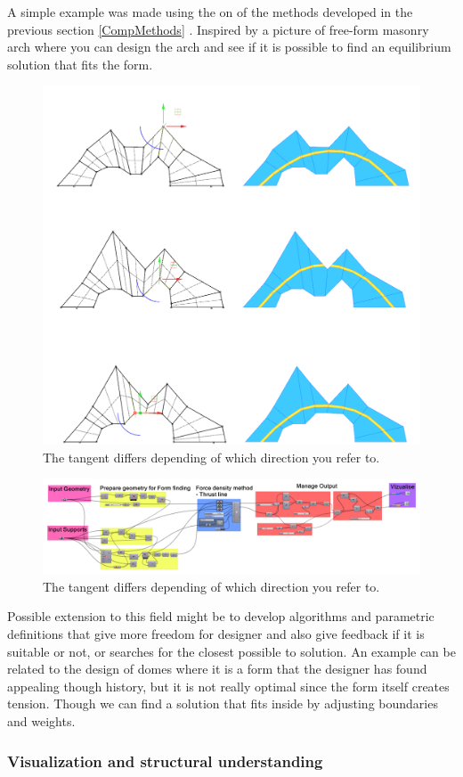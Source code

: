 A simple example was made using the on of the methods developed in the previous section \ref{CompMethods} . Inspired by a picture of free-form masonry arch where you can design the arch and see if it is possible to find an equilibrium solution that fits the form.

\begin{figure}[H]
\centering
\includegraphics[width=0.6\linewidth ]{figure/Introduction/PreStudyDes.png}
\caption{The tangent differs depending of which direction you refer to. }
\end{figure}


\begin{figure}[H]
\centering
\includegraphics[width=0.9\linewidth ]{figure/Introduction/PreStudyDes3.png}
\caption{The tangent differs depending of which direction you refer to. }
\end{figure}

Possible extension to this field might be to develop algorithms and parametric definitions that give more freedom for designer and also give feedback if it is suitable or not, or searches for the closest possible to solution. An example can be related to the design of domes where it is a form that the designer has found appealing though history, but it is not really optimal since the form itself creates tension. Though we can find a solution that fits inside by adjusting boundaries and weights.

\subsubsection{Visualization and structural understanding }

